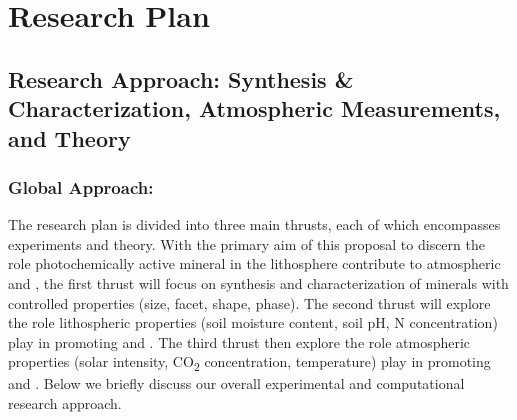 \newpage
\section{Research Plan}
\label{sec:research_plan}
\vspace{1mm}


\subsection{Research Approach: Synthesis \& Characterization, Atmospheric Measurements, and Theory}
\label{sec:methods_approach}

\vspace{1mm}
\subsubsection*{Global Approach:}
\vspace{1mm}

The research plan is divided into three main thrusts, each of which encompasses experiments and theory. With the primary aim of this proposal to discern the role photochemically active mineral in the lithosphere contribute to atmospheric \NH\hspace{1mm} and \NO, the first thrust will focus on synthesis and characterization of minerals with controlled properties (size, facet, shape, phase). The second thrust will explore the role lithospheric properties (soil moisture content, soil pH, N concentration) play in promoting \NH\hspace{1mm} and \NO. The third thrust then explore the role atmospheric properties (solar intensity, CO\textsubscript{2} concentration, temperature) play in promoting \NH\hspace{1mm} and \NO. Below we briefly discuss our overall experimental and computational research approach. 

\vspace{1mm}
